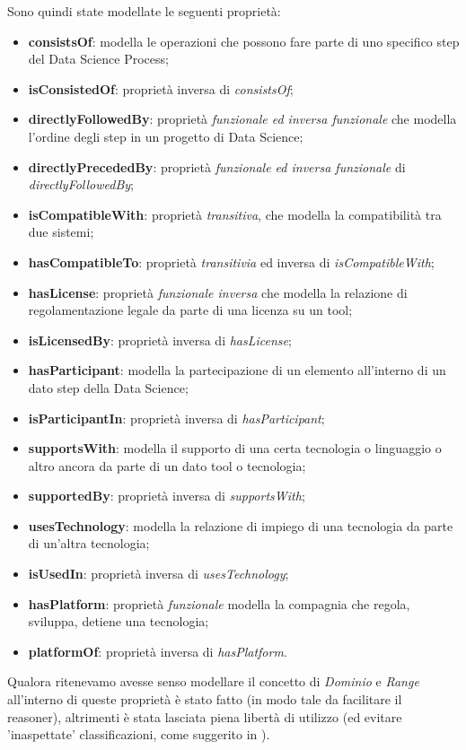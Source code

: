 Sono quindi state modellate le seguenti proprietà:
\begin{itemize}
    \item \textbf{consistsOf}: modella le operazioni che possono fare parte di uno specifico step del Data Science Process;
    \item \textbf{isConsistedOf}: proprietà inversa di \textit{consistsOf};
    \item \textbf{directlyFollowedBy}: proprietà \textit{funzionale ed inversa funzionale} che modella l'ordine degli step in un progetto di Data Science;
    \item \textbf{directlyPrecededBy}: proprietà \textit{funzionale ed inversa funzionale} di \textit{directlyFollowedBy};
    \item \textbf{isCompatibleWith}: proprietà \textit{transitiva}, che modella la compatibilità tra due sistemi;
    \item \textbf{hasCompatibleTo}: proprietà \textit{transitivia} ed inversa di \textit{isCompatibleWith};
    \item \textbf{hasLicense}: proprietà \textit{funzionale inversa} che modella la relazione di regolamentazione legale da parte di una licenza su un tool;
    \item \textbf{isLicensedBy}: proprietà inversa di \textit{hasLicense};
    \item \textbf{hasParticipant}: modella la partecipazione di un elemento all'interno di un dato step della Data Science;
    \item \textbf{isParticipantIn}: proprietà inversa di \textit{hasParticipant};
    \item \textbf{supportsWith}: modella il supporto di una certa tecnologia o linguaggio o altro ancora da parte di un dato tool o tecnologia;
    \item \textbf{supportedBy}: proprietà inversa di \textit{supportsWith};
    \item \textbf{usesTechnology}: modella la relazione di impiego di una tecnologia da parte di un'altra tecnologia;
    \item \textbf{isUsedIn}: proprietà inversa di \textit{usesTechnology};
    \item \textbf{hasPlatform}: proprietà \textit{funzionale} modella la compagnia che regola, sviluppa, detiene una tecnologia;
    \item \textbf{platformOf}: proprietà inversa di \textit{hasPlatform}.
\end{itemize}

Qualora ritenevamo avesse senso modellare il concetto di \textit{Dominio} e \textit{Range} all'interno di queste proprietà è stato fatto (in modo tale da facilitare il reasoner), altrimenti è stata lasciata piena libertà di utilizzo (ed evitare 'inaspettate' classificazioni, come suggerito in \cite{Protege_Tutorial}).

